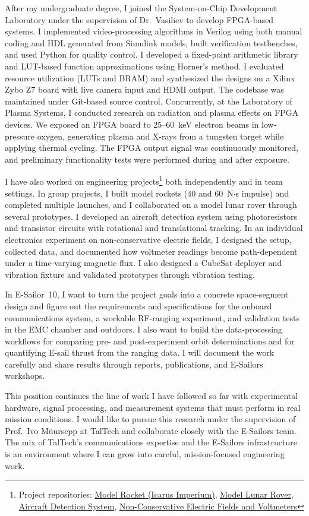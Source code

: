 \documentclass[a4paper,12pt]{article}
\begin{document}
After my undergraduate degree, I joined the System-on-Chip Development Laboratory under the supervision of Dr.\ Vasiliev to develop FPGA-based systems. I implemented video-processing algorithms in Verilog using both manual coding and HDL generated from Simulink models, built verification testbenches, and used Python for quality control. I developed a fixed-point arithmetic library and LUT-based function approximations using Horner's method. I evaluated resource utilization (LUTs and BRAM) and synthesized the designs on a Xilinx Zybo Z7 board with live camera input and HDMI output. The codebase was maintained under Git-based source control. Concurrently, at the Laboratory of Plasma Systems, I conducted research on radiation and plasma effects on FPGA devices. We exposed an FPGA board to 25--60~keV electron beams in low-pressure oxygen, generating plasma and X-rays from a tungsten target while applying thermal cycling. The FPGA output signal was continuously monitored, and preliminary functionality tests were performed during and after exposure.

I have also worked on engineering projects\footnote{Project repositories: \href{https://github.com/icarus-imperium/rocket-2025}{Model Rocket (Icarus Imperium)}, \href{https://github.com/rezaaliasgarirenani/Rover}{Model Lunar Rover}, \href{https://github.com/rezaaliasgarirenani/Aircraft-Detection-System}{Aircraft Detection System}, \href{https://github.com/rezaaliasgarirenani/Non-Conservative-Electric-Fields-and-Voltmeters}{Non-Conservative Electric Fields and Voltmeters}} both independently and in team settings. In group projects, I built model rockets (40 and 60~N$\cdot$s impulse) and completed multiple launches, and I collaborated on a model lunar rover through several prototypes. I developed an aircraft detection system using photoresistors and transistor circuits with rotational and translational tracking. In an individual electronics experiment on non-conservative electric fields, I designed the setup, collected data, and documented how voltmeter readings become path-dependent under a time-varying magnetic flux. I also designed a CubeSat deployer and vibration fixture and validated prototypes through vibration testing.

In E-Sailor~10, I want to turn the project goals into a concrete space-segment design and figure out the requirements and specifications for the onboard communications system, a workable RF-ranging experiment, and validation tests in the EMC chamber and outdoors. I also want to build the data-processing workflows for comparing pre- and post-experiment orbit determinations and for quantifying E-sail thrust from the ranging data. I will document the work carefully and share results through reports, publications, and E-Sailors workshops.

This position continues the line of work I have followed so far with experimental hardware, signal processing, and measurement systems that must perform in real mission conditions. I would like to pursue this research under the supervision of Prof.\ Ivo M\"uursepp at TalTech and collaborate closely with the E-Sailors team. The mix of TalTech's communications expertise and the E-Sailors infrastructure is an environment where I can grow into careful, mission-focused engineering work.
\end{document}
